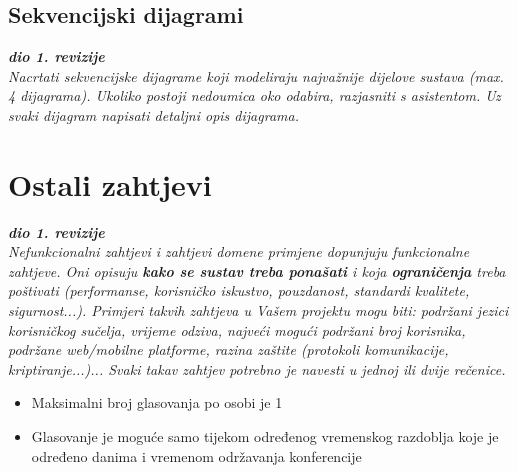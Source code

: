 			\subsection{Sekvencijski dijagrami}
				
				\textbf{\textit{dio 1. revizije}}\\
				
				\textit{Nacrtati sekvencijske dijagrame koji modeliraju najvažnije dijelove sustava (max. 4 dijagrama). Ukoliko postoji nedoumica oko odabira, razjasniti s asistentom. Uz svaki dijagram napisati detaljni opis dijagrama.}
				\eject
	
		\section{Ostali zahtjevi}
		
			\textbf{\textit{dio 1. revizije}}\\
		 
			 \textit{Nefunkcionalni zahtjevi i zahtjevi domene primjene dopunjuju funkcionalne zahtjeve. Oni opisuju \textbf{kako se sustav treba ponašati} i koja \textbf{ograničenja} treba poštivati (performanse, korisničko iskustvo, pouzdanost, standardi kvalitete, sigurnost...). Primjeri takvih zahtjeva u Vašem projektu mogu biti: podržani jezici korisničkog sučelja, vrijeme odziva, najveći mogući podržani broj korisnika, podržane web/mobilne platforme, razina zaštite (protokoli komunikacije, kriptiranje...)... Svaki takav zahtjev potrebno je navesti u jednoj ili dvije rečenice.}
			 \begin{itemize}
			 	\item Maksimalni broj glasovanja po osobi je 1
			 	\item Glasovanje je moguće samo tijekom određenog vremenskog razdoblja koje je određeno danima i vremenom održavanja konferencije
			 \end{itemize}
			 
			 
			 
	
